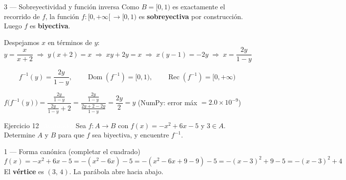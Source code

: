 \documentclass[letterpaper, 11pt]{article}
\begin{document}
\begin{paso}{3 — Sobreyectividad y función inversa}
Como $B=[0,1)$ es exactamente el recorrido de $f$, la función $f:[0,+\infty[\,\to [0,1)$ es \textbf{sobreyectiva} por construcción.
Luego $f$ es \textbf{biyectiva}.

Despejamos $x$ en términos de $y$:
\[
    y = \frac{x}{x+2}
    \;\Longrightarrow\;
    y(x+2) = x
    \;\Longrightarrow\;
    xy + 2y = x
    \;\Longrightarrow\;
    x(y-1) = -2y
    \;\Longrightarrow\;
    \boxed{x = \frac{2y}{1-y}}
\]
\end{paso}

\begin{resultado}
\[
    f^{-1}(y) = \frac{2y}{1-y},\qquad
    \operatorname{Dom}(f^{-1}) = [0,1),\qquad
    \operatorname{Rec}(f^{-1}) = [0,+\infty)
\]
\end{resultado}

\begin{verificacion}
$f\bigl(f^{-1}(y)\bigr)
= \dfrac{\tfrac{2y}{1-y}}{\tfrac{2y}{1-y}+2}
= \dfrac{\tfrac{2y}{1-y}}{\tfrac{2y+2-2y}{1-y}}
= \dfrac{2y}{2} = y$ \checkmark\quad
(NumPy: error máx $= 2.0\times10^{-9}$)
\end{verificacion}

\newpage

\begin{enunciado}{Ejercicio 12 \hfill \normalsize\textcolor{white}{[Avanzado]}}
Sea $f:A\to B$ con $f(x)=-x^2+6x-5$ y $3\in A$.
Determine $A$ y $B$ para que $f$ sea biyectiva, y encuentre $f^{-1}$.
\end{enunciado}

\begin{paso}{1 — Forma canónica (completar el cuadrado)}
\[
    f(x) = -x^2+6x-5
         = -(x^2-6x)-5
         = -(x^2-6x+9-9)-5
         = -(x-3)^2+9-5
         = -(x-3)^2+4
\]
El \textbf{vértice} es $(3,\,4)$. La parábola abre hacia abajo.
\end{paso}
\end{document}
